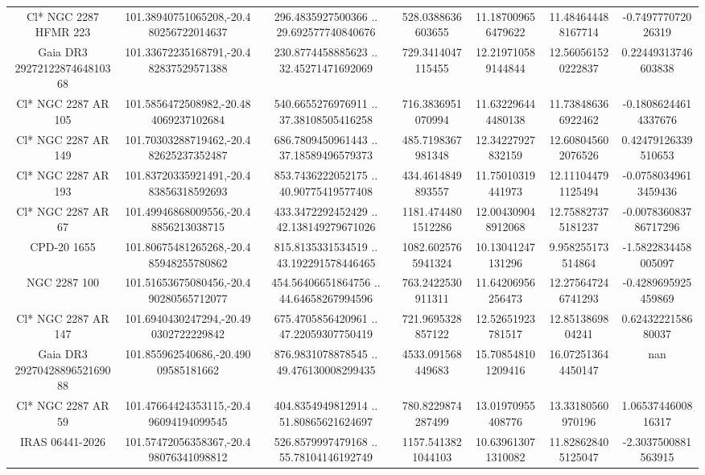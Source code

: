 \begin{table}
\begin{tabular}{ccccccc}
Cl* NGC 2287   HFMR     223 & 101.38940751065208,-20.480256722014637 & 296.4835927500366 .. 29.692577740840676 & 528.0388636603655 & 11.187009656479622 & 11.484644488167714 & -0.749777072026319 \\
Gaia DR3 2927212287464810368 & 101.33672235168791,-20.482837529571388 & 230.8774458885623 .. 32.45271471692069 & 729.3414047115455 & 12.219710589144844 & 12.560561520222837 & 0.22449313746603838 \\
Cl* NGC 2287     AR     105 & 101.5856472508982,-20.484069237102684 & 540.6655276976911 .. 37.38108505416258 & 716.3836951070994 & 11.632296444480138 & 11.738486366922462 & -0.18086244614337676 \\
Cl* NGC 2287     AR     149 & 101.70303288719462,-20.482625237352487 & 686.7809450961443 .. 37.18589496579373 & 485.7198367981348 & 12.34227927832159 & 12.608045602076526 & 0.42479126339510653 \\
Cl* NGC 2287     AR     193 & 101.83720335921491,-20.483856318592693 & 853.7436222052175 .. 40.90775419577408 & 434.4614849893557 & 11.75010319441973 & 12.111044791125494 & -0.07580349613459436 \\
Cl* NGC 2287     AR      67 & 101.49946868009556,-20.48856213038715 & 433.3472292452429 .. 42.138149279671026 & 1181.4744801512286 & 12.004309048912068 & 12.758827375181237 & -0.007836083786717296 \\
CPD-20  1655 & 101.80675481265268,-20.485948255780862 & 815.8135331534519 .. 43.192291578446465 & 1082.6025765941324 & 10.13041247131296 & 9.958255173514864 & -1.5822834458005097 \\
NGC  2287   100 & 101.51653675080456,-20.490280565712077 & 454.56406651864756 .. 44.64658267994596 & 763.2422530911311 & 11.64206956256473 & 12.275647246741293 & -0.4289695925459869 \\
Cl* NGC 2287     AR     147 & 101.6940430247294,-20.490302722229842 & 675.4705856420961 .. 47.22059307750419 & 721.9695328857122 & 12.52651923781517 & 12.8513869804241 & 0.6243222158680037 \\
Gaia DR3 2927042889652169088 & 101.855962540686,-20.49009585181662 & 876.9831078878545 .. 49.476130008299435 & 4533.091568449683 & 15.708548101209416 & 16.072513644450147 & nan \\
Cl* NGC 2287     AR      59 & 101.47664424353115,-20.496094194099545 & 404.8354949812914 .. 51.80865621624697 & 780.8229874287499 & 13.01970955408776 & 13.33180560970196 & 1.0653744600816317 \\
IRAS 06441-2026 & 101.57472056358367,-20.498076341098812 & 526.8579997479168 .. 55.78104146192749 & 1157.5413821044103 & 10.639613071310082 & 11.828628405125047 & -2.3037500881563915 \\

\end{tabular}
\end{table}
